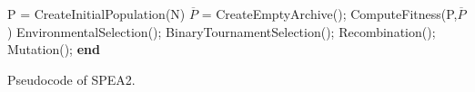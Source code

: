 \begin{algorithm}[H]
\begin{algorithmic}[1]
\State P = CreateInitialPopulation(N)\;
\State $\overline{P}$ = CreateEmptyArchive();\;
    \State ComputeFitness(P,$\overline{P}$)
    \State EnvironmentalSelection();
    \State BinaryTournamentSelection();
    \State Recombination();
    \State Mutation();
  \EndWhile
  \State \textbf{end}
\end{algorithmic}
\caption{Pseudocode of SPEA2.}
\end{algorithm}